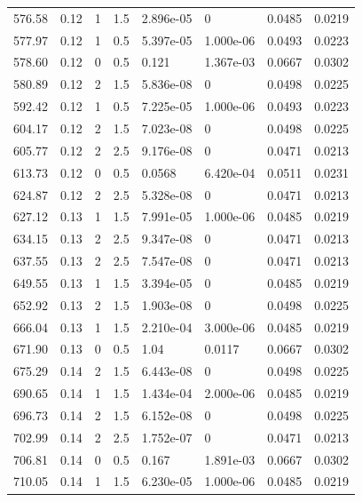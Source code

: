 \documentclass[preview]{standalone}
\begin{document}
{{{\begin{tabular}{L{1.2cm}C{1.2cm} C{0.3cm}C{0.5cm} C{1.4cm}C{1.4cm} C{1.4cm}C{1.4cm}}
  576.58  &  0.12  & 1     & 1.5 &  2.896e-05  & 0  & 0.0485 &  0.0219   \\ 
  577.97  &  0.12  & 1     & 0.5 &  5.397e-05  & 1.000e-06  & 0.0493 &  0.0223   \\ 
  578.60  &  0.12  & 0     & 0.5 &  0.121  & 1.367e-03  & 0.0667 &  0.0302   \\ 
  580.89  &  0.12  & 2     & 1.5 &  5.836e-08  & 0  & 0.0498 &  0.0225   \\ 
  592.42  &  0.12  & 1     & 0.5 &  7.225e-05  & 1.000e-06  & 0.0493 &  0.0223   \\ 
  604.17  &  0.12  & 2     & 1.5 &  7.023e-08  & 0  & 0.0498 &  0.0225   \\ 
  605.77  &  0.12  & 2     & 2.5 &  9.176e-08  & 0  & 0.0471 &  0.0213   \\ 
  613.73  &  0.12  & 0     & 0.5 &  0.0568  & 6.420e-04  & 0.0511 &  0.0231   \\ 
  624.87  &  0.12  & 2     & 2.5 &  5.328e-08  & 0  & 0.0471 &  0.0213   \\ 
  627.12  &  0.13  & 1     & 1.5 &  7.991e-05  & 1.000e-06  & 0.0485 &  0.0219   \\ 
  634.15  &  0.13  & 2     & 2.5 &  9.347e-08  & 0  & 0.0471 &  0.0213   \\ 
  637.55  &  0.13  & 2     & 2.5 &  7.547e-08  & 0  & 0.0471 &  0.0213   \\ 
  649.55  &  0.13  & 1     & 1.5 &  3.394e-05  & 0  & 0.0485 &  0.0219   \\ 
  652.92  &  0.13  & 2     & 1.5 &  1.903e-08  & 0  & 0.0498 &  0.0225   \\ 
  666.04  &  0.13  & 1     & 1.5 &  2.210e-04  & 3.000e-06  & 0.0485 &  0.0219   \\ 
  671.90  &  0.13  & 0     & 0.5 &  1.04  & 0.0117  & 0.0667 &  0.0302   \\ 
  675.29  &  0.14  & 2     & 1.5 &  6.443e-08  & 0  & 0.0498 &  0.0225   \\ 
  690.65  &  0.14  & 1     & 1.5 &  1.434e-04  & 2.000e-06  & 0.0485 &  0.0219   \\ 
  696.73  &  0.14  & 2     & 1.5 &  6.152e-08  & 0  & 0.0498 &  0.0225   \\ 
  702.99  &  0.14  & 2     & 2.5 &  1.752e-07  & 0  & 0.0471 &  0.0213   \\ 
  706.81  &  0.14  & 0     & 0.5 &  0.167  & 1.891e-03  & 0.0667 &  0.0302   \\ 
  710.05  &  0.14  & 1     & 1.5 &  6.230e-05  & 1.000e-06  & 0.0485 &  0.0219   \\ 

\end{tabular}}}}
\end{document}
